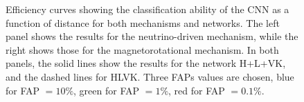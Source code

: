 \documentclass[aps,twocolumn,showpacs,groupedaddress, nofootinbib]{revtex4}  %
\begin{document}
%
%
\begin{figure}
     \begin{center}
        \quad
    \end{center}
    \caption{Efficiency curves showing the classification ability of the
\ac{CNN} as a function of distance for both mechanisms and networks.  The left
panel shows the results for the neutrino-driven mechanism, while the right
shows those for the magnetorotational mechanism. In both panels, the solid
lines show the results for the network H+L+VK, and the dashed lines for HLVK.
Three \acp{FAP} values are chosen, blue for \ac{FAP} $=10\%$, green for \ac{FAP}
$=1\%$, red for \ac{FAP} $=0.1\%$.\label{fig:eff}}
\end{figure}
\end{document}
